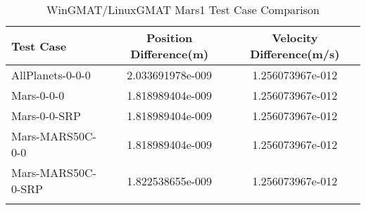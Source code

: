 \begin{table}[htbp!]
\centering
\caption{ WinGMAT/LinuxGMAT Mars1 Test Case Comparison}
      \begin{tabular}{lcc}
      \hline\hline
          Test Case & Position Difference(m) & Velocity Difference(m/s) \\
         \hline
         AllPlanets-0-0-0 & 2.033691978e-009 & 1.256073967e-012 \\
         Mars-0-0-0 & 1.818989404e-009 & 1.256073967e-012 \\
         Mars-0-0-SRP & 1.818989404e-009 & 1.256073967e-012 \\
         Mars-MARS50C-0-0 & 1.818989404e-009 & 1.256073967e-012 \\
         Mars-MARS50C-0-SRP & 1.822538655e-009 & 1.256073967e-012 \\
      \hline\hline
      \label{Table: Mars1 WinGMAT-LinuxGMAT Table} 
\end{tabular}
\end{table}
